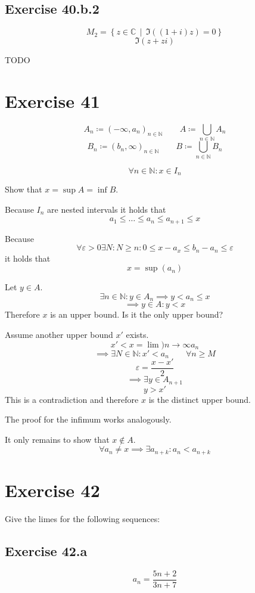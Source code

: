 \documentclass[a4paper]{article}
\theoremstyle{definition}
\newcommand\setdef[2]{\left\{#1\,\middle|\,#2\right\}}
\begin{document}
\subsection{Exercise 40.b.2}
\[ M_2 = \setdef{z \in \mathbb C}{\Im((1 + i)z) = 0} \]
\[ \Im(z + zi) \]

TODO


\section{Exercise 41}

\[ A_n \coloneqq (-\infty, a_n)_{n \in \mathbb N} \qquad A \coloneqq \bigcup_{n \in \mathbb N} A_n \]
\[ B_n \coloneqq (b_n, \infty)_{n \in \mathbb N} \qquad B \coloneqq \bigcup_{n \in \mathbb N} B_n \]

\[ \forall n \in \mathbb N: x \in I_n \]

Show that $x = \sup{A} = \inf{B}$.

Because $I_n$ are nested intervals it holds that
\[ a_1 \leq \dots \leq a_n \leq a_{n+1} \leq x \]

Because
\[ \forall \varepsilon > 0 \exists N: N \geq n: 0 \leq x - a_x \leq b_n - a_n \leq \varepsilon \]
it holds that
\[ x = \sup(a_n) \]

Let $y \in A$.
\[ \exists n \in \mathbb N: y \in A_n \implies y < a_n \leq x \]
\[ \implies y \in A: y < x \]
Therefore $x$ is an upper bound. Is it the only upper bound?

Assume another upper bound $x'$ exists.
\[ x' < x = \lim){n\to\infty} a_n \]
\[ \implies \exists N \in \mathbb N: x' < a_n \qquad \forall n \geq M \]
\[ \varepsilon = \frac{x - x'}{2} \]
\[ \implies \exists y \in A_{n+1} \]
\[ y > x' \]
This is a contradiction and therefore $x$ is the distinct upper bound.

The proof for the infimum works analogously.

It only remains to show that $x \not\in A$.
\[ \forall a_n \neq x \implies \exists a_{n+k}: a_n < a_{n+k} \]

\section{Exercise 42}
Give the limes for the following sequences:

\subsection{Exercise 42.a}
\[ a_n = \frac{5n+2}{3n+7} \]
\end{document}
